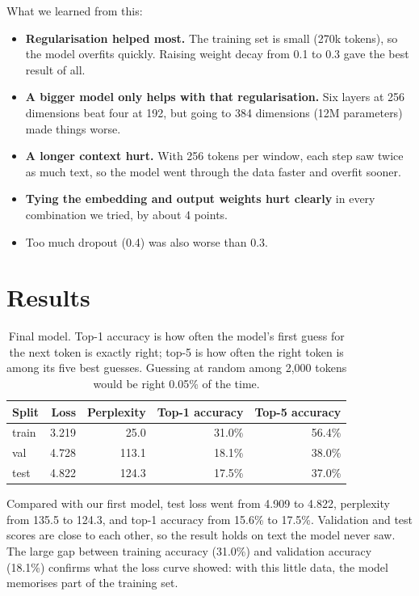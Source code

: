 \documentclass[11pt,a4paper]{article}
\begin{document}
What we learned from this:
\begin{itemize}
\item \textbf{Regularisation helped most.} The training set is small (270k tokens), so the model overfits quickly. Raising weight decay from 0.1 to 0.3 gave the best result of all.
\item \textbf{A bigger model only helps with that regularisation.} Six layers at 256 dimensions beat four at 192, but going to 384 dimensions (12M parameters) made things worse.
\item \textbf{A longer context hurt.} With 256 tokens per window, each step saw twice as much text, so the model went through the data faster and overfit sooner.
\item \textbf{Tying the embedding and output weights hurt clearly} in every combination we tried, by about 4 points.
\item Too much dropout (0.4) was also worse than 0.3.
\end{itemize}

\section{Results}

\begin{table}[H]
\centering
\begin{tabular}{lrrrr}
\toprule
Split & Loss & Perplexity & Top-1 accuracy & Top-5 accuracy \\
\midrule
train & 3.219 & 25.0 & 31.0\% & 56.4\% \\
val & 4.728 & 113.1 & 18.1\% & 38.0\% \\
test & 4.822 & 124.3 & 17.5\% & 37.0\% \\
\bottomrule
\end{tabular}
\caption{Final model. Top-1 accuracy is how often the model's first guess for the next token is exactly right; top-5 is how often the right token is among its five best guesses. Guessing at random among 2{,}000 tokens would be right 0.05\% of the time.}
\end{table}

Compared with our first model, test loss went from 4.909 to 4.822, perplexity from 135.5 to 124.3, and top-1 accuracy from 15.6\% to 17.5\%. Validation and test scores are close to each other, so the result holds on text the model never saw. The large gap between training accuracy (31.0\%) and validation accuracy (18.1\%) confirms what the loss curve showed: with this little data, the model memorises part of the training set.
\end{document}
